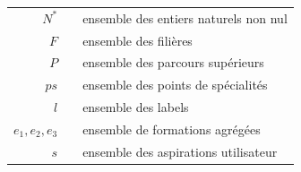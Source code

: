 \begin{center}
	\begin{tabular}[t]{rp{5mm}p{12cm}}
        $N^*$  & & ensemble des entiers naturels non nul\\
		$F$  & & ensemble des filières\\
        $P$  & & ensemble des parcours supérieurs\\
        $ps$ & & ensemble des points de spécialités\\
        $l$ & & ensemble des labels\\
        $e_1, e_2, e_3$ & & ensemble de formations agrégées\\
        $s$ & & ensemble des aspirations utilisateur\\
        
	\end{tabular}
\end{center}
